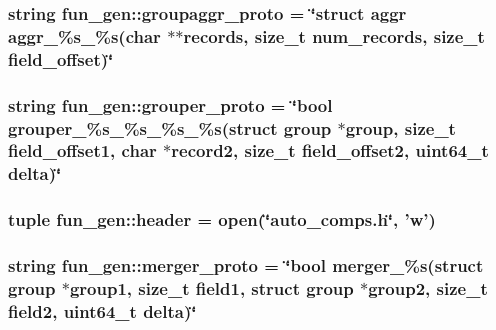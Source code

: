 \hypertarget{namespacefun__gen_a28e6f18a249f700dbe6f13fcf12fd44a}{
\subsubsection[{groupaggr\-\_\-proto}]{\setlength{\rightskip}{0pt plus 5cm}string {\bf fun\-\_\-gen\-::groupaggr\-\_\-proto} = \char`\"{}struct {\bf aggr} aggr\-\_\-\%s\-\_\-\%s(char $\ast$$\ast$records, size\-\_\-t num\-\_\-records, size\-\_\-t field\-\_\-offset)\char`\"{}}}\label{namespacefun__gen_a28e6f18a249f700dbe6f13fcf12fd44a}
\hypertarget{namespacefun__gen_a73685c5a808b19d3a0d239c25fbf1bde}{
\subsubsection[{grouper\-\_\-proto}]{\setlength{\rightskip}{0pt plus 5cm}string {\bf fun\-\_\-gen\-::grouper\-\_\-proto} = \char`\"{}bool grouper\-\_\-\%s\-\_\-\%s\-\_\-\%s\-\_\-\%s(struct {\bf group} $\ast${\bf group}, size\-\_\-t field\-\_\-offset1, char $\ast$record2, size\-\_\-t field\-\_\-offset2, uint64\-\_\-t delta)\char`\"{}}}\label{namespacefun__gen_a73685c5a808b19d3a0d239c25fbf1bde}
\hypertarget{namespacefun__gen_a6ae1f74cc5476582c44a74abfd58b9da}{
\subsubsection[{header}]{\setlength{\rightskip}{0pt plus 5cm}tuple {\bf fun\-\_\-gen\-::header} = open(\char`\"{}auto\-\_\-comps.\-h\char`\"{}, 'w')}}\label{namespacefun__gen_a6ae1f74cc5476582c44a74abfd58b9da}
\hypertarget{namespacefun__gen_aaea004d0d849466492a010a6a527388b}{
\subsubsection[{merger\-\_\-proto}]{\setlength{\rightskip}{0pt plus 5cm}string {\bf fun\-\_\-gen\-::merger\-\_\-proto} = \char`\"{}bool merger\-\_\-\%s(struct {\bf group} $\ast$group1, size\-\_\-t field1, struct {\bf group} $\ast$group2, size\-\_\-t field2, uint64\-\_\-t delta)\char`\"{}}}\label{namespacefun__gen_aaea004d0d849466492a010a6a527388b}
